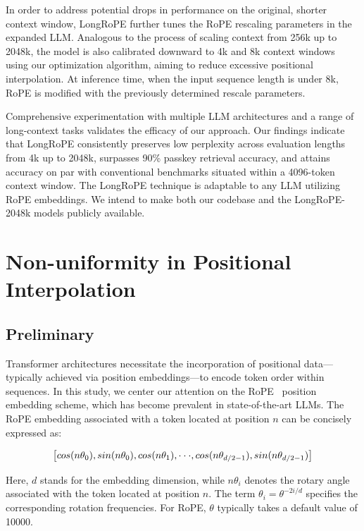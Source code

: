In order to address potential drops in performance on the original, shorter context window, {LongRoPE} further tunes the RoPE rescaling parameters in the expanded LLM. Analogous to the process of scaling context from 256k up to 2048k, the model is also calibrated downward to 4k and 8k context windows using our optimization algorithm, aiming to reduce excessive positional interpolation. At inference time, when the input sequence length is under 8k, RoPE is modified with the previously determined rescale parameters.

Comprehensive experimentation with multiple LLM architectures and a range of long-context tasks validates the efficacy of our approach. Our findings indicate that LongRoPE consistently preserves low perplexity across evaluation lengths from 4k up to 2048k, surpasses 90\% passkey retrieval accuracy, and attains accuracy on par with conventional benchmarks situated within a 4096-token context window. The LongRoPE technique is adaptable to any LLM utilizing RoPE embeddings. We intend to make both our codebase and the LongRoPE-2048k models publicly available.

\section{Non-uniformity in Positional Interpolation}
\label{sec:analysis}

\subsection{Preliminary}

Transformer architectures necessitate the incorporation of positional data—typically achieved via position embeddings—to encode token order within sequences. In this study, we center our attention on the RoPE~\cite{rope} position embedding scheme, which has become prevalent in state-of-the-art LLMs. The RoPE embedding associated with a token located at position $n$ can be concisely expressed as:

\begin{equation}
		\fontsize{7.8}{7.8} \selectfont
	\label{eq:rope}
	\left[ cos(n\theta_0), sin(n\theta_0), cos(n\theta_1), \cdot\cdot\cdot, cos(n\theta_{d/2-1}), sin(n\theta_{d/2-1}) \right]   
\end{equation}

Here, $d$ stands for the embedding dimension, while $n\theta_i$ denotes the rotary angle associated with the token located at position $n$. The term $\theta_i=\theta^{-2i/d}$ specifies the corresponding rotation frequencies. For RoPE, $\theta$ typically takes a default value of 10000.


